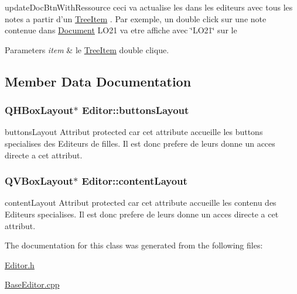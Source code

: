 update\-Doc\-Btn\-With\-Ressource ceci va actualise les  dans les editeurs avec tous les notes a partir d'un \hyperlink{class_tree_item}{Tree\-Item} . Par exemple, un double click sur une note contenue dans \hyperlink{class_document}{Document} L\-O21 va etre affiche avec \char`\"{}\-L\-O21\char`\"{} sur le  


\begin{DoxyParams}{Parameters}
{\em item} & le \hyperlink{class_tree_item}{Tree\-Item} double clique. \\
\hline
\end{DoxyParams}


\subsection{Member Data Documentation}
\hypertarget{class_editor_ae45af55e341d855ecb4c2c48417103ab}{
\subsubsection[{buttons\-Layout}]{\setlength{\rightskip}{0pt plus 5cm}Q\-H\-Box\-Layout$\ast$ Editor\-::buttons\-Layout\hspace{0.3cm}{\ttfamily [protected]}}}\label{class_editor_ae45af55e341d855ecb4c2c48417103ab}


buttons\-Layout Attribut protected car cet attribute accueille les buttons specialises des Editeurs de filles. Il est donc prefere de leurs donne un acces directe a cet attribut. 

\hypertarget{class_editor_accd030211f8af68d4ff7fc03ac55a9ea}{
\subsubsection[{content\-Layout}]{\setlength{\rightskip}{0pt plus 5cm}Q\-V\-Box\-Layout$\ast$ Editor\-::content\-Layout\hspace{0.3cm}{\ttfamily [protected]}}}\label{class_editor_accd030211f8af68d4ff7fc03ac55a9ea}


content\-Layout Attribut protected car cet attribute accueille les contenu des Editeurs specialises. Il est donc prefere de leurs donne un acces directe a cet attribut. 



The documentation for this class was generated from the following files\-:\begin{DoxyCompactItemize}
\item 
\hyperlink{_editor_8h}{Editor.\-h}\item 
\hyperlink{_base_editor_8cpp}{Base\-Editor.\-cpp}\end{DoxyCompactItemize}
